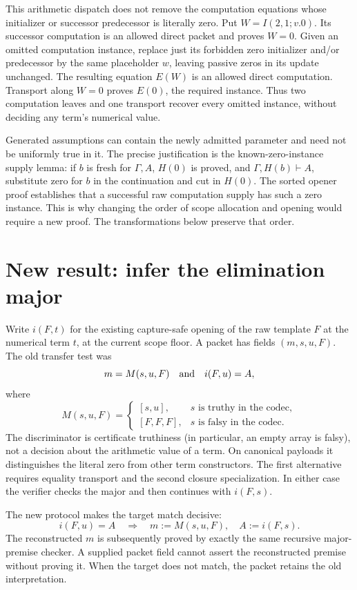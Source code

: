 This arithmetic dispatch does not remove the computation equations whose
initializer or successor predecessor is literally zero. Put
$W=I(2,1;v.0)$. Its successor computation is an allowed direct packet and
proves $W=0$. Given an omitted computation instance, replace just its
forbidden zero initializer and/or predecessor by the same placeholder
$w$, leaving passive zeros in its update unchanged. The resulting
equation $E(W)$ is an allowed direct computation. Transport along $W=0$
proves $E(0)$, the required instance. Thus two computation leaves and one
transport recover every omitted instance, without deciding any term's
numerical value.

Generated assumptions can contain the newly admitted parameter and need
not be uniformly true in it. The precise justification is the
known-zero-instance supply lemma: if $b$ is fresh for $\Gamma,A$,
$H(0)$ is proved, and $\Gamma,H(b)\vdash A$, substitute zero for $b$
in the continuation and cut in $H(0)$. The sorted opener proof establishes
that a successful raw computation supply has such a zero instance.
This is why changing the order of scope allocation and opening would
require a new proof. The transformations below preserve that order.

\section{New result: infer the elimination major}
\label{sec:inferred}

Write $i(F,t)$ for the existing capture-safe opening of the raw template
$F$ at the numerical term $t$, at the current scope floor. A packet has
fields $(m,s,u,F)$. The old transfer test was
\[
 m=M(s,u,F)\quad\hbox{and}\quad i(F,u)=A,
\]
where
\[
 M(s,u,F)=
 \begin{cases}
 [s,u],&s\text{ is truthy in the codec},\\
 [F,F,F],&s\text{ is falsy in the codec}.
 \end{cases}
\]
The discriminator is certificate truthiness (in particular, an empty
array is falsy), not a decision about the arithmetic value of a term.
On canonical payloads it distinguishes the literal zero from other term
constructors. The first alternative requires equality transport and the
second closure specialization. In either case the verifier checks the major and then
continues with $i(F,s)$.

The new protocol makes the target match decisive:
\[
 \boxed{\ i(F,u)=A\quad\Longrightarrow\quad
       m:=M(s,u,F),\quad A:=i(F,s).\ }
\]
The reconstructed $m$ is subsequently proved by exactly the same recursive
major-premise checker. A supplied packet field cannot assert the
reconstructed premise without proving it. When the target does not match,
the packet retains the old interpretation.

